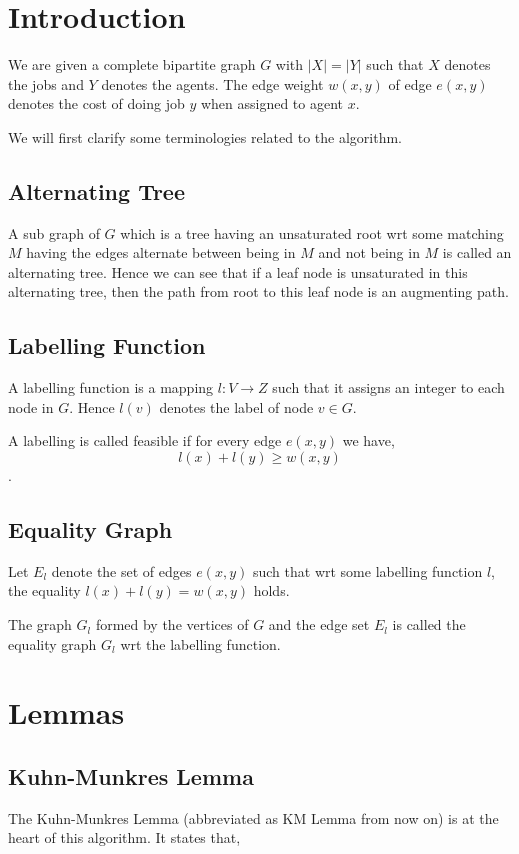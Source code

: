\documentclass{article}
\begin{document}
\Large
\section{Introduction}
We are given a complete bipartite graph $G$ with $|X|=|Y|$ such that $X$ denotes the jobs and $Y$ denotes the agents. The edge weight $w(x, y)$ of edge $e(x, y)$ denotes the cost of doing job $y$ when assigned to agent $x$.

We will first clarify some terminologies related to the algorithm.

\subsection{Alternating Tree}
A sub graph of $G$ which is a tree having an unsaturated root wrt some matching $M$ having the edges alternate between being in $M$ and not being in $M$ is called an alternating tree. Hence we can see that if a leaf node is unsaturated in this alternating tree, then the path from root to this leaf node is an augmenting path.

\subsection{Labelling Function}
A labelling function is a mapping $l: V \to Z$ such that it assigns an integer to each node in $G$. Hence $l(v)$ denotes the label of node $v \in G$.

A labelling is called feasible if for every edge $e(x, y)$ we have,
$$l(x)+l(y) \geq w(x, y)$$.

\subsection{Equality Graph}
Let $E_l$ denote the set of edges $e(x, y)$ such that wrt some labelling function $l$, the equality $l(x)+l(y) = w(x, y)$ holds.

The graph $G_l$ formed by the vertices of $G$ and the edge set $E_l$ is called the equality graph $G_l$ wrt the labelling function.

\section{Lemmas}

\subsection{Kuhn-Munkres Lemma}
The Kuhn-Munkres Lemma (abbreviated as KM Lemma from now on) is at the heart of this algorithm. It states that,
\end{document}
